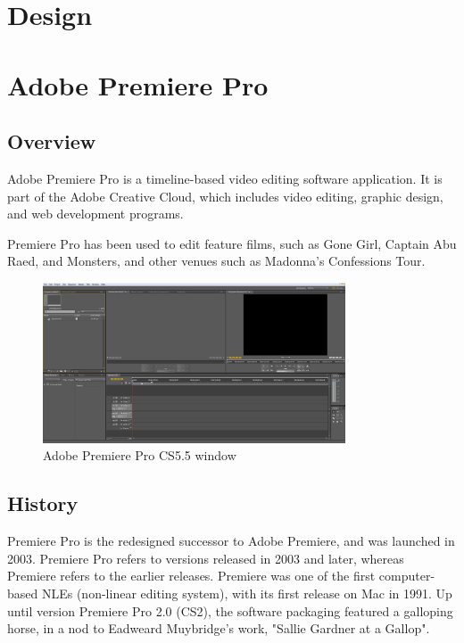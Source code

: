 \documentclass[thesis=B,english]{FITthesis}[2012/10/20]
\begin{document}
\chapter{Design}
\chapter{Adobe Premiere Pro}
\section{Overview}

Adobe Premiere Pro is a timeline-based video editing software application. It is part of the Adobe Creative Cloud, which includes video editing, graphic design, and web development programs.

Premiere Pro has been used to edit feature films, such as Gone Girl, Captain Abu Raed, and Monsters, and other venues such as Madonna's Confessions Tour.\cite{adobe}

	\begin{figure}
		\centering
		\includegraphics[width=0.8\textwidth]{PremiereMain.png}
		\caption{Adobe Premiere Pro CS5.5 window}\label{fig:APPWindow}
	\end{figure}

\section{History}

Premiere Pro is the redesigned successor to Adobe Premiere, and was launched in 2003. Premiere Pro refers to versions released in 2003 and later, whereas Premiere refers to the earlier releases. Premiere was one of the first computer-based NLEs (non-linear editing system), with its first release on Mac in 1991. Up until version Premiere Pro 2.0 (CS2), the software packaging featured a galloping horse, in a nod to Eadweard Muybridge's work, "Sallie Gardner at a Gallop".\cite{adobe}
\end{document}
